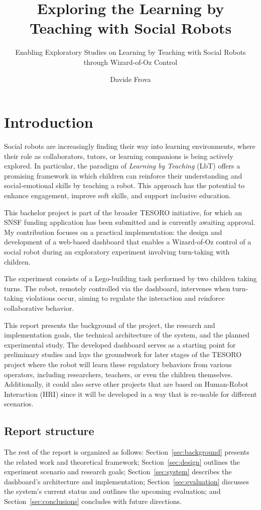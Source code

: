 \documentclass[a4paper]{usiinfbachelorproject}
\author{Davide Frova}
\title{\textbf{Exploring the Learning by Teaching with Social Robots}}
\subtitle{Enabling Exploratory Studies on Learning by Teaching with Social Robots through Wizard-of-Oz Control}
\begin{document}
\maketitle
\tableofcontents\newpage

\section{\textbf{Introduction}}

Social robots are increasingly finding their way into learning environments, where their role as collaborators, tutors, or learning companions is being actively explored. In particular, the paradigm of \textit{Learning by Teaching} (LbT) offers a promising framework in which children can reinforce their understanding and social-emotional skills by teaching a robot. This approach has the potential to enhance engagement, improve soft skills, and support inclusive education.

This bachelor project is part of the broader TESORO initiative, for which an SNSF funding application has been submitted and is currently awaiting approval. My contribution focuses on a practical implementation: the design and development of a web-based dashboard that enables a Wizard-of-Oz control of a social robot during an exploratory experiment involving turn-taking with children.

The experiment consists of a Lego-building task performed by two children taking turns. The robot, remotely controlled via the dashboard, intervenes when turn-taking violations occur, aiming to regulate the interaction and reinforce collaborative behavior.

This report presents the background of the project, the research and implementation goals, the technical architecture of the system, and the planned experimental study.
The developed dashboard serves as a starting point for preliminary studies and lays the groundwork for later stages of the TESORO project where the robot will learn these regulatory behaviors from various operators, including researchers, teachers, or even the children themselves. Additionally, it could also serve other projects that are based on Human-Robot Interaction (HRI) since it will be developed in a way that is re-usable for different scenarios.

\subsection{\textbf{Report structure}}
The rest of the report is organized as follows: Section~\ref{sec:background} presents the related work and theoretical framework; Section~\ref{sec:design} outlines the experiment scenario and research goals; Section~\ref{sec:system} describes the dashboard's architecture and implementation; Section~\ref{sec:evaluation} discusses the system's current status and outlines the upcoming evaluation; and Section~\ref{sec:conclusions} concludes with future directions.
\end{document}
